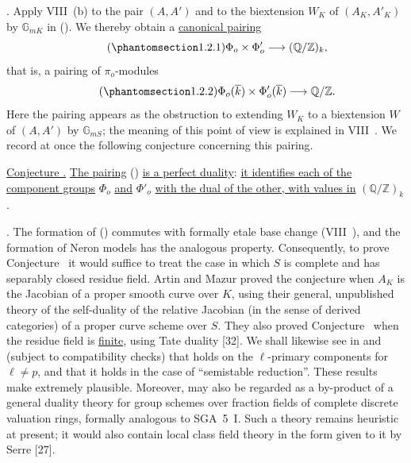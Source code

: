 
\medskip
\noindent
{}. Apply VIII~(b) to the pair $(A,A')$ and to the biextension
$W_K$ of $(A_K,A'_K)$ by $\mathbb G_{mK}$ in ().  We thereby
obtain a \underline{canonical pairing}
\begin{equation}\tag{\SGARefTarget{sga7.sga7i.eix.n1-2-1}{1.2.1}}
 \Phi_o\times\Phi'_o\longrightarrow(\mathbb Q/\mathbb Z)_k,
\end{equation}
that is, a pairing of $\pi_o$-modules
\begin{equation}\tag{\SGARefTarget{sga7.sga7i.eix.n1-2-2}{1.2.2}}
 \Phi_o(\overline k)\times\Phi'_o(\overline k)
 \longrightarrow\mathbb Q/\mathbb Z.
\end{equation}
Here the pairing appears as the obstruction to extending $W_K$ to a
biextension $W$ of $(A,A')$ by $\mathbb G_{mS}$; the meaning of this
point of view is explained in VIII~.  We record at once the
following conjecture concerning this pairing.

\medskip
\noindent
\underline{Conjecture .} \underline{The pairing} ()
\underline{is a perfect duality}: \underline{it identifies each of the
component groups} $\Phi_o$ \underline{and} $\Phi'_o$
\underline{with the dual of the other, with values in}
$(\mathbb Q/\mathbb Z)_k$.

\medskip
\noindent
{}. The formation of () commutes with formally etale base
change (VIII~), and the formation of Neron models has the
analogous property.  Consequently, to prove Conjecture~ it would
suffice to treat the case in which $S$ is complete and has separably
closed residue field.  Artin and Mazur proved the conjecture when
$A_K$ is the Jacobian of a proper smooth curve over $K$, using their
general, unpublished theory of the self-duality of the relative
Jacobian (in the sense of derived categories) of a proper curve scheme
over $S$.  They also proved Conjecture~ when the residue field is
\underline{finite}, using Tate duality [32].  We shall likewise see in
 and  (subject to compatibility checks) that  holds on the
$\ell$-primary components for $\ell\ne p$, and that it holds in the
case of ``semistable reduction''.  These results make  extremely
plausible.  Moreover,  may also be regarded as a by-product of a
general duality theory for group schemes over fraction fields of
complete discrete valuation rings, formally analogous to SGA~5~I.
Such a theory remains heuristic at present; it would also contain
local class field theory in the form given to it by Serre [27].

